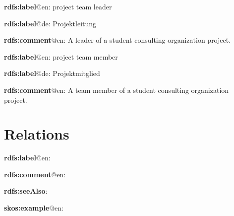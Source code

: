 \documentclass[a4paper, DIV=13, BCOR=0cm]{scrbook}
\begin{document}
\begin{mdframed}[style=onto-3, frametitle={Project\_Team\_Leader}]
	{%
		\begin{compactitem}
			\item \textbf{rdfs:label}@en: project team leader
			\item \textbf{rdfs:label}@de: Projektleitung
			\item \textbf{rdfs:comment}@en: A leader of a student consulting organization project.
		\end{compactitem}
	} %
\end{mdframed}

\begin{mdframed}[style=onto-3, frametitle={Project\_Team\_Member}]
	{%
		\begin{compactitem}
			\item \textbf{rdfs:label}@en: project team member
			\item \textbf{rdfs:label}@de: Projektmitglied
			\item \textbf{rdfs:comment}@en: A team member of a student consulting organization project.
		\end{compactitem}
	} %
\end{mdframed}




\section{Relations }

\begin{mdframed}[style=onto, frametitle={TEMPLATE}]
	{%
		\begin{compactitem}
			\item \textbf{rdfs:label}@en: 
			\item \textbf{rdfs:comment}@en: 
			\item \textbf{rdfs:seeAlso}:
			\item \textbf{skos:example}@en:
		\end{compactitem}
	} %
\end{mdframed}
\end{document}
